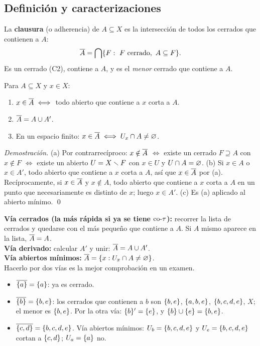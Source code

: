 \subsection{Definición y caracterizaciones}
\begin{definicion}
La \textbf{clausura} (o adherencia) de $A\subseteq X$ es la intersección de todos los cerrados que contienen a $A$:
\[\cl{A}=\bigcap\{F:\ F\text{ cerrado},\ A\subseteq F\}.\]
Es un cerrado (C2), contiene a $A$, y es el \emph{menor} cerrado que contiene a $A$.
\end{definicion}
\begin{teorema}
Para $A\subseteq X$ y $x\in X$:
\begin{enumerate}[label=(\alph*),leftmargin=1.9em]
\item $x\in\overline{A}\iff$ todo abierto que contiene a $x$ corta a $A$.
\item $\overline{A}=A\cup A'$.
\item En un espacio finito: $x\in\overline{A}\iff U_x\cap A\neq\varnothing$.
\end{enumerate}
\end{teorema}
\emph{Demostración.} (a) Por contrarrecíproco: $x\notin\overline{A}$ $\iff$ existe un cerrado $F\supseteq A$ con $x\notin F$
$\iff$ existe un abierto $U=X\smallsetminus F$ con $x\in U$ y $U\cap A=\varnothing$.
(b) Si $x\in A$ o $x\in A'$, todo abierto que contiene a $x$ corta a $A$, así que $x\in\overline{A}$ por (a).
Recíprocamente, si $x\in\overline{A}$ y $x\notin A$, todo abierto que contiene a $x$ corta a $A$ en un punto que
necesariamente es distinto de $x$; luego $x\in A'$. (c) Es (a) aplicado al abierto mínimo. \qed

\begin{metodo}
\textbf{Vía cerrados (la más rápida si ya se tiene $\mathrm{co}\text{-}\tau$):} recorrer la lista de cerrados y quedarse con el más
pequeño que contiene a $A$. Si $A$ mismo aparece en la lista, $\overline{A}=A$.\\[2pt]
\textbf{Vía derivado:} calcular $A'$ y unir: $\overline{A}=A\cup A'$.\\[2pt]
\textbf{Vía abiertos mínimos:} $\overline{A}=\{x: U_x\cap A\neq\varnothing\}$.\\[2pt]
Hacerlo por dos vías es la mejor comprobación en un examen.
\end{metodo}

\begin{ejemplo}[Ejemplo: Parte I, $\tau_1$, con $\co{\tau_1}=\{\vac,X,\s{a},\s{b,e},\s{a,b,e},\s{b,c,d,e}\}$]
\begin{itemize}
\item $\overline{\{a\}}=\{a\}$: ya es cerrado.
\item $\overline{\{b\}}=\{b,e\}$: los cerrados que contienen a $b$ son $\{b,e\}$, $\{a,b,e\}$, $\{b,c,d,e\}$, $X$; el menor es
$\{b,e\}$. Por la otra vía: $\{b\}'=\{e\}$, y $\{b\}\cup\{e\}=\{b,e\}$.
\item $\overline{\{c,d\}}=\{b,c,d,e\}$. Vía abiertos mínimos: $U_b=\{b,c,d,e\}$ y $U_e=\{b,c,d,e\}$ cortan a $\{c,d\}$;
$U_a=\{a\}$ no.
\end{itemize}
\end{ejemplo}

